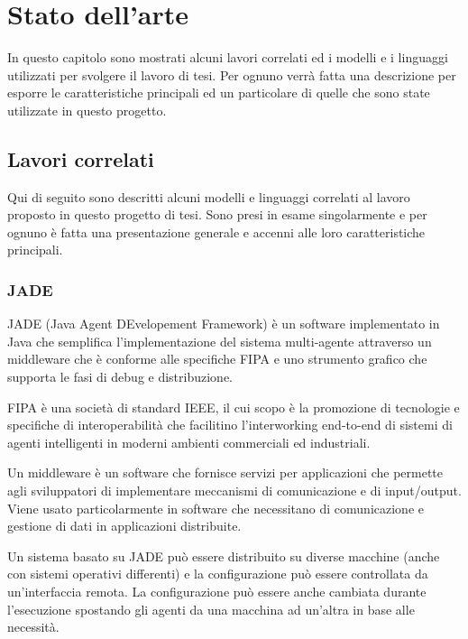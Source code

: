 \chapter{Stato dell'arte}
\lhead[\fancyplain{}{\bfseries\thepage}]{\fancyplain{}{\bfseries\rightmark}}

In questo capitolo sono mostrati alcuni lavori correlati ed i modelli e i linguaggi utilizzati per svolgere il lavoro di tesi. Per ognuno verr\`a fatta una descrizione per esporre le caratteristiche principali ed un particolare di quelle che sono state utilizzate in questo progetto.

\section{Lavori correlati}
Qui di seguito sono descritti alcuni modelli e linguaggi correlati al lavoro proposto in questo progetto di tesi. Sono presi in esame singolarmente e per ognuno \`e fatta una presentazione generale e accenni alle loro caratteristiche principali.

\subsection{JADE}
JADE (Java Agent DEvelopement Framework) \`e un software implementato in Java che semplifica l'implementazione del sistema multi-agente attraverso un middleware che \`e conforme alle specifiche FIPA e uno strumento grafico che supporta le fasi di debug e distribuzione.

FIPA \`e una societ\`a di standard IEEE, il cui scopo \`e la promozione di tecnologie e specifiche di interoperabilit\`a che facilitino l'interworking end-to-end di sistemi di agenti intelligenti in moderni ambienti commerciali ed industriali.

Un middleware \`e un software che fornisce servizi per applicazioni che permette agli sviluppatori di implementare meccanismi di comunicazione e di input/output. Viene usato particolarmente in software che necessitano di comunicazione e gestione di dati in applicazioni distribuite.

Un sistema basato su JADE pu\`o essere distribuito su diverse macchine (anche con sistemi operativi differenti) e la configurazione pu\`o essere controllata da un'interfaccia remota. La configurazione pu\`o essere anche cambiata durante l'esecuzione spostando gli agenti da una macchina ad un'altra in base alle necessit\`a.

